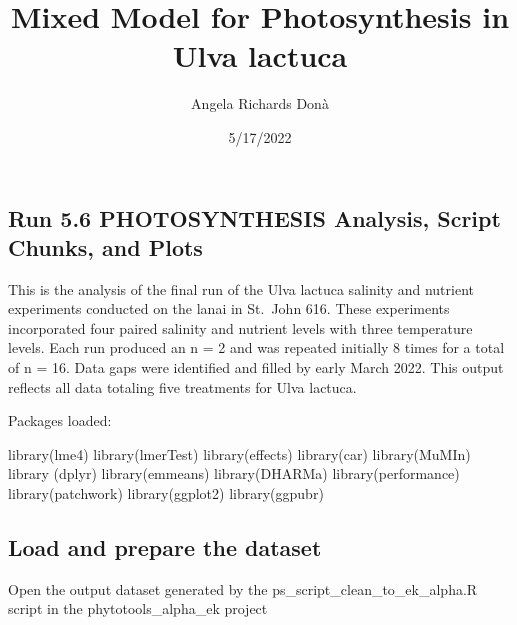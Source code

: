 \documentclass[
]{article}
\title{Mixed Model for Photosynthesis in Ulva lactuca}
\author{Angela Richards Donà}
\date{5/17/2022}
\newenvironment{Shaded}{\begin{snugshade}}{\end{snugshade}}
\newcommand{\FunctionTok}[1]{\textcolor[rgb]{0.00,0.00,0.00}{#1}}
\newcommand{\NormalTok}[1]{#1}
\begin{document}
\maketitle

\hypertarget{section}{%
\section{}\label{section}}

\hypertarget{run-5.6-photosynthesis-analysis-script-chunks-and-plots}{%
\subsection{Run 5.6 PHOTOSYNTHESIS Analysis, Script Chunks, and
Plots}\label{run-5.6-photosynthesis-analysis-script-chunks-and-plots}}

This is the analysis of the final run of the Ulva lactuca salinity and
nutrient experiments conducted on the lanai in St.~John 616. These
experiments incorporated four paired salinity and nutrient levels with
three temperature levels. Each run produced an n = 2 and was repeated
initially 8 times for a total of n = 16. Data gaps were identified and
filled by early March 2022. This output reflects all data totaling five
treatments for Ulva lactuca.

Packages loaded:

\begin{Shaded}
\begin{Highlighting}[]
\FunctionTok{library}\NormalTok{(lme4)}
\FunctionTok{library}\NormalTok{(lmerTest)}
\FunctionTok{library}\NormalTok{(effects)}
\FunctionTok{library}\NormalTok{(car)}
\FunctionTok{library}\NormalTok{(MuMIn)}
\FunctionTok{library}\NormalTok{ (dplyr)}
\FunctionTok{library}\NormalTok{(emmeans)}
\FunctionTok{library}\NormalTok{(DHARMa)}
\FunctionTok{library}\NormalTok{(performance)}
\FunctionTok{library}\NormalTok{(patchwork)}
\FunctionTok{library}\NormalTok{(ggplot2)}
\FunctionTok{library}\NormalTok{(ggpubr)}
\end{Highlighting}
\end{Shaded}

\hypertarget{load-and-prepare-the-dataset}{%
\subsection{Load and prepare the
dataset}\label{load-and-prepare-the-dataset}}

Open the output dataset generated by the
ps\_script\_clean\_to\_ek\_alpha.R script in the phytotools\_alpha\_ek
project
\end{document}
